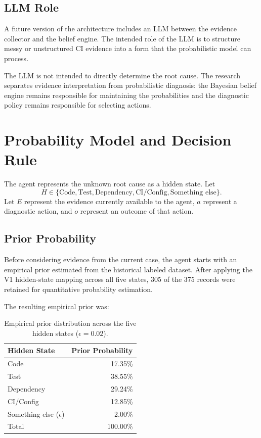 \documentclass{article}
\begin{document}
\subsection{LLM Role}

A future version of the architecture includes an LLM between the evidence collector and the belief engine. The intended role of the LLM is to structure messy or unstructured CI evidence into a form that the probabilistic model can process.

The LLM is not intended to directly determine the root cause. The research separates evidence interpretation from probabilistic diagnosis: the Bayesian belief engine remains responsible for maintaining the probabilities and the diagnostic policy remains responsible for selecting actions.

\section{Probability Model and Decision Rule}

The agent represents the unknown root cause as a hidden state. Let
\[
H \in \{\text{Code}, \text{Test}, \text{Dependency}, \text{CI/Config}, \text{Something else}\}.
\]
Let $E$ represent the evidence currently available to the agent, $a$ represent a diagnostic action, and $o$ represent an outcome of that action.

\subsection{Prior Probability}

Before considering evidence from the current case, the agent starts with an empirical prior estimated from the historical labeled dataset. After applying the V1 hidden-state mapping across all five states, 305 of the 375 records were retained for quantitative probability estimation.

The resulting empirical prior was:

\begin{table}[t]
\centering
\caption{Empirical prior distribution across the five hidden states ($\epsilon = 0.02$).}
\label{tab:prior}
\begin{tabular}{lr}
\toprule
Hidden State & Prior Probability \\
\midrule
Code & 17.35\% \\
Test & 38.55\% \\
Dependency & 29.24\% \\
CI/Config & 12.85\% \\
Something else ($\epsilon$) & 2.00\% \\
\midrule
Total & 100.00\% \\
\bottomrule
\end{tabular}
\end{table}
\end{document}
